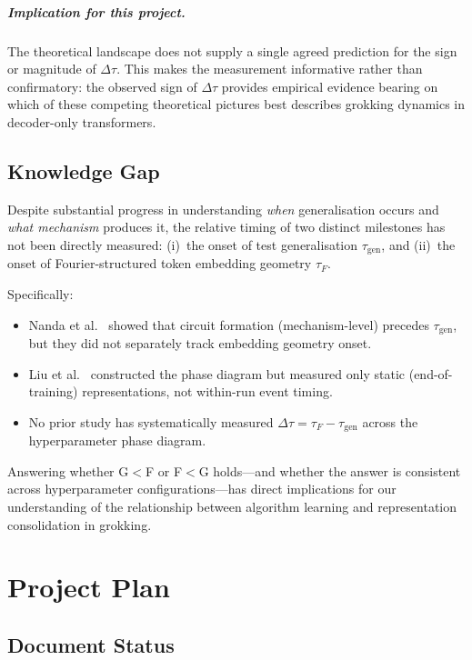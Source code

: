 \documentclass[12pt,openany,oneside,a4paper]{book}
\newcommand{\taug}{\tau_{\mathrm{gen}}}
\newcommand{\tauf}{\tau_{F}}
\newcommand{\Dtau}{\Delta\tau}
\begin{document}
\paragraph{Implication for this project.}
The theoretical landscape does not supply a single agreed prediction
for the sign or magnitude of $\Dtau$.
This makes the measurement informative rather than confirmatory: the
observed sign of $\Dtau$ provides empirical evidence bearing on
which of these competing theoretical pictures best describes
grokking dynamics in decoder-only transformers.

\section{Knowledge Gap}

Despite substantial progress in understanding \emph{when} generalisation
occurs and \emph{what mechanism} produces it, the relative timing of
two distinct milestones has not been directly measured:
(i)~the onset of test generalisation $\taug$, and
(ii)~the onset of Fourier-structured token embedding geometry $\tauf$.

Specifically:
\begin{itemize}
  \item Nanda et al.\ \cite{nanda2023progress} showed that circuit
    formation (mechanism-level) precedes $\taug$, but they did not
    separately track embedding geometry onset.
  \item Liu et al.\ \cite{liu2022towards} constructed the phase diagram
    but measured only static (end-of-training) representations, not
    within-run event timing.
  \item No prior study has systematically measured $\Dtau = \tauf - \taug$
    across the hyperparameter phase diagram.
\end{itemize}
Answering whether G$<$F or F$<$G holds---and whether the answer is
consistent across hyperparameter configurations---has direct implications
for our understanding of the relationship between algorithm learning
and representation consolidation in grokking.

\chapter{Project Plan}
\label{chap:plan}

\section*{Document Status}
{}
\end{document}
